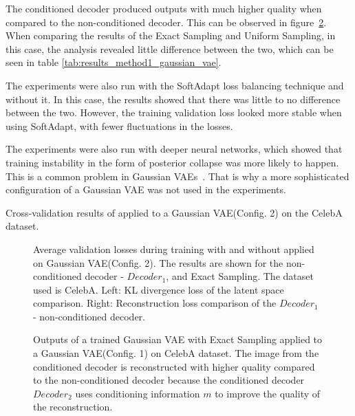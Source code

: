 The conditioned decoder produced outputs with much higher quality when compared to the non-conditioned decoder. This can be observed in figure~\ref{fig:rec_gaussian}. When comparing the results of the Exact Sampling and Uniform Sampling, in this case, the analysis revealed little difference between the two, which can be seen in table \ref{tab:results_method1_gaussian_vae}.

The experiments were also run with the SoftAdapt loss balancing technique and without it. In this case, the results showed
that there was little to no difference between the two. However, the training validation loss looked more stable when using SoftAdapt, with fewer fluctuations in the losses.

The experiments were also run with deeper neural networks, which showed that training instability in the form of posterior collapse was more likely to happen. This is a common problem in Gaussian VAEs~\cite{wang2023posterior}. That is why a more sophisticated configuration of a Gaussian VAE was not used in the experiments. 


\begin{table}[H]
    \centering
    
    \caption{Cross-validation results of  applied to a Gaussian VAE(Config. 2) on the CelebA dataset.}
    \label{tab:results_method1_gaussian_vae}
\end{table}

\begin{figure}[H]
    \centering
    \scalebox{0.48}{}
    \scalebox{0.48}{}
    \caption[Validation loss during training of a Gaussian VAE.]
    {
        Average validation losses during training with and without  applied on Gaussian VAE(Config. 2). The results are shown for the non-conditioned decoder - $Decoder_1$, and Exact Sampling. The dataset used is CelebA.
        Left: KL divergence loss of the latent space comparison. Right: Reconstruction loss comparison of the $Decoder_1$ - non-conditioned decoder.
    }
    \label{fig:results_method1_gaussian_vae}
\end{figure}


\begin{figure}[H]
    \centering
    
    \caption[Trained neural network with  applied to a Gaussian VAE.]
    { 
        Outputs of a trained Gaussian VAE with  Exact Sampling applied to a Gaussian VAE(Config. 1) on CelebA dataset. The image from the conditioned decoder is reconstructed with higher quality compared to the non-conditioned decoder because the conditioned decoder $Decoder_2$ uses conditioning information $m$ to improve the quality of the reconstruction.
    }
    \label{fig:rec_gaussian}
\end{figure}

